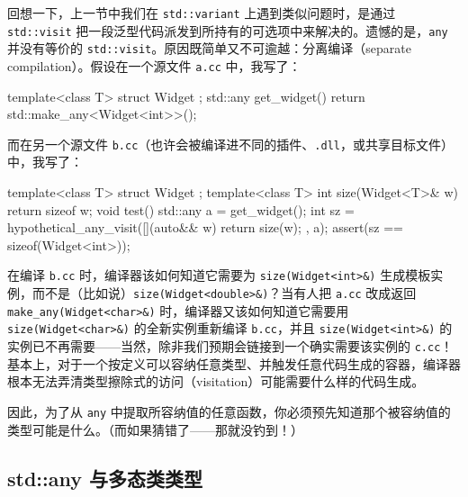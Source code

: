 回想一下，上一节中我们在 \texttt{std::\allowbreak{}variant} 上遇到类似问题时，是通过 \texttt{std::\allowbreak{}visit} 把一段泛型代码派发到所持有的可选项中来解决的。遗憾的是，\texttt{any} 并没有等价的 \texttt{std::\allowbreak{}visit}。原因既简单又不可逾越：分离编译（separate compilation）。假设在一个源文件 \texttt{a.\allowbreak{}cc} 中，我写了：

\begin{codebox}[cpp]
    template<class T> struct Widget {};
    std::any get_widget() {
      return std::make_any<Widget<int>>();
    }
\end{codebox}

而在另一个源文件 \texttt{b.\allowbreak{}cc}（也许会被编译进不同的插件、\texttt{.dll}，或共享目标文件）中，我写了：

\begin{codebox}[cpp]
    template<class T> struct Widget {};
    template<class T> int size(Widget<T>& w) {
      return sizeof w;
    }
    void test()
    {
      std::any a = get_widget();
      int sz = hypothetical_any_visit([](auto&& w){
        return size(w);
      }, a);
      assert(sz == sizeof(Widget<int>));
    }
\end{codebox}

在编译 \texttt{b.\allowbreak{}cc} 时，编译器该如何知道它需要为 \texttt{size(\allowbreak{}Widget<\allowbreak{}int>\allowbreak{}\&)\allowbreak{}} 生成模板实例，而不是（比如说）\texttt{size(\allowbreak{}Widget<\allowbreak{}double>\allowbreak{}\&)\allowbreak{}}？当有人把 \texttt{a.\allowbreak{}cc} 改成返回 \texttt{make\_\allowbreak{}any(\allowbreak{}Widget<\allowbreak{}char>\allowbreak{}\&)\allowbreak{}} 时，编译器又该如何知道它需要用 \texttt{size(\allowbreak{}Widget<\allowbreak{}char>\allowbreak{}\&)\allowbreak{}} 的全新实例重新编译 \texttt{b.\allowbreak{}cc}，并且 \texttt{size(\allowbreak{}Widget<\allowbreak{}int>\allowbreak{}\&)\allowbreak{}} 的实例已不再需要——当然，除非我们预期会链接到一个确实需要该实例的 \texttt{c.\allowbreak{}cc}！基本上，对于一个按定义可以容纳任意类型、并触发任意代码生成的容器，编译器根本无法弄清类型擦除式的访问（visitation）可能需要什么样的代码生成。

因此，为了从 \texttt{any} 中提取所容纳值的任意函数，你必须预先知道那个被容纳值的类型可能是什么。（而如果猜错了——那就没钓到！）

\subsection{std::any 与多态类类型}

